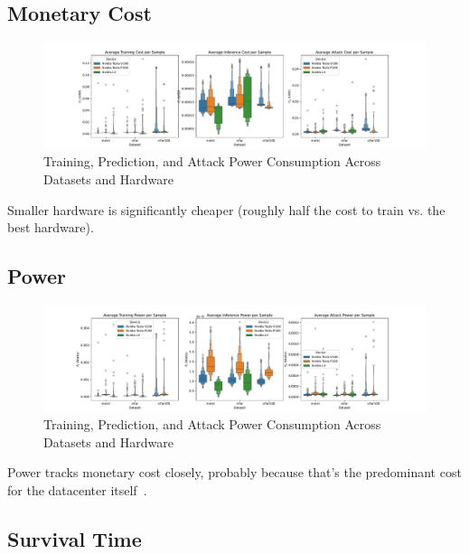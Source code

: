 \documentclass[conference]{IEEEtran}
\begin{document}
\subsection{Monetary Cost}


\begin{figure}
    \centering
    \includegraphics[width=\textwidth]{plots/combined/cost.pdf}
    \caption{Training, Prediction, and Attack Power Consumption Across Datasets and Hardware}
    \label{fig:time}
\end{figure}
Smaller hardware is significantly cheaper (roughly half the cost to train vs. the best hardware).

\subsection{Power}
\begin{figure}
    \centering
    \includegraphics[width=\textwidth]{plots/combined/power.pdf}
    \caption{Training, Prediction, and Attack Power Consumption Across Datasets and Hardware}
    \label{fig:time}
\end{figure}
Power tracks monetary cost closely, probably because that's the predominant cost for the datacenter itself~\cite{}.

\subsection{Survival Time}
\end{document}
